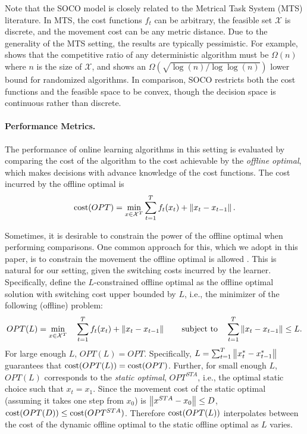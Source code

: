 Note that the SOCO model is closely related to the Metrical Task System (MTS) literature.  In MTS, the cost functions $f_t$ can be arbitrary, the feasible set $\mathcal{X}$ is discrete, and the movement cost can be any metric distance. Due to the generality of the MTS setting, the results are typically pessimistic. For example, \cite{borodin1992} shows that the competitive ratio of any deterministic algorithm must be $\Omega(n)$ where $n$ is the size of $\mathcal{X}$, and \cite{blum1992} shows an $\Omega(\sqrt{\log(n)/\log\log(n)})$ lower bound for randomized algorithms. In comparison, SOCO restricts both the cost functions and the feasible space to be convex, though the decision space is continuous rather than discrete.

\paragraph{Performance Metrics.}
The performance of online learning algorithms in this setting is evaluated by comparing the cost of the algorithm to the cost achievable by the \textit{offline optimal}, which makes decisions with advance knowledge of the cost functions. The cost incurred by the offline optimal is  
\begin{equation}
\mathrm{cost}(OPT) = \min_{x \in \mathcal{X}^T} \sum_{t=1}^T f_t(x_t) + \left\lVert x_t - x_{t-1} \right\rVert.
\label{eqn: offline-cost}
\end{equation}

Sometimes, it is desirable to constrain the power of the offline optimal when performing comparisons.  One common approach for this, which we adopt in this paper, is to constrain the movement the offline optimal is allowed \citep{blum1992,buchbinder2012unified,Blum2000}. This is natural for our setting, given the switching costs incurred by the learner. Specifically, define the $L$-constrained offline optimal as the offline optimal solution with switching cost upper bounded by $L$, i.e., the minimizer of the following (offline) problem:
\begin{align*}
OPT(L) = \min_{x \in \mathcal{X}^T}\quad \sum_{t=1}^T f_t(x_t) + \left\lVert x_t - x_{t-1} \right\rVert \qquad
 \text{subject to} \quad \sum_{t=1}^T \left\lVert x_t - x_{t-1} \right\rVert \le L.  
\end{align*}
For large enough $L$, $OPT(L)=OPT$.  Specifically, $L = \sum_{t=1}^T \left\lVert x_t^* - x_{t-1}^* \right\rVert$ guarantees that $\mathrm{cost}(OPT(L)) = \mathrm{cost}(OPT)$. Further, for small enough $L$, $OPT(L)$ corresponds to the \emph{static optimal}, $OPT^{STA}$, i.e., the optimal static choice such that $x_t=x_1$. Since the movement cost of the static optimal (assuming it takes one step from $x_0$) is $\left\lVert x^{STA}- x_0 \right\rVert \le D$, $\mathrm{cost}(OPT(D)) \le \mathrm{cost}(OPT^{STA})$. Therefore $\mathrm{cost}(OPT(L))$ interpolates between the cost of the dynamic offline optimal to the static offline optimal as $L$ varies.  

